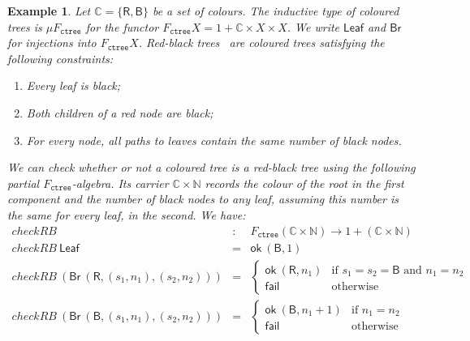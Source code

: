\documentclass{LMCS}
\newcommand{\tyname}[1]{\texttt{#1}}
\newcommand{\ok}{\mathsf{ok}}
\newtheorem{eorollary}{Example}
\begin{document}
\begin{eorollary}
  Let $\mathbb{C} = \{ \mathsf{R}, \mathsf{B} \}$ be a set of colours.
  The inductive type of coloured trees is $\mu F_{\tyname{ctree}}$ for
  the functor $F_{\tyname{ctree}}X = 1 + \mathbb{C} \times X \times
  X$.  We write $\mathsf{Leaf}$ and $\mathsf{Br}$ for injections into
  $F_\tyname{ctree}X$. Red-black trees~\cite{cormen01intro} are
  coloured trees satisfying the following constraints:
\begin{enumerate}
\item Every leaf is black;
\item Both children of a red node are black;
\item For every node, all paths to leaves contain the same number of
  black nodes.
\end{enumerate}
We can check whether or not a coloured tree is a red-black tree using
the following partial $F_{\tyname{ctree}}$-algebra. Its carrier
$\mathbb{C} \times \mathbb{N}$ records the colour of the root in the
first component and the number of black nodes to any leaf, assuming
this number is the same for every leaf, in the second. We have:
\begin{displaymath}
  \begin{array}{lll}
    \mathit{checkRB}  &:& F_{\tyname{ctree}}(\mathbb{C} \times
    \mathbb{N}) \to 1 + (\mathbb{C} \times \mathbb{N}) \\ 
    \mathit{checkRB}\ \mathsf{Leaf} & = & 
    \ok\ (\mathsf{B}, 1) \\
    \mathit{checkRB}\ (\mathsf{Br}\ (\mathsf{R}, (s_1,n_1), (s_2, n_2))) & = & 
    \left\{
      \begin{array}{ll}
        \ok\ (\mathsf{R}, n_1) &
          \textrm{if }s_1 = s_2 = \mathsf{B} 
          \textrm{ and }n_1 = n_2 \\
        \mathsf{fail}        & \textrm{otherwise}
      \end{array}
    \right.\\
    \mathit{checkRB}\ (\mathsf{Br}\ (\mathsf{B}, (s_1,n_1), (s_2, n_2))) & = & 
    \left\{
      \begin{array}{ll}
        \ok\ (\mathsf{B}, n_1 + 1) & \textrm{if }n_1 = n_2 \\
        \mathsf{fail}        & \textrm{otherwise}
      \end{array}
    \right.
  \end{array}
\end{displaymath}
\end{eorollary}
\end{document}
